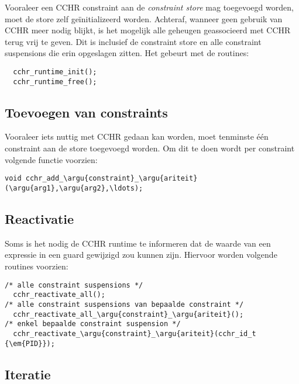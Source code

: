 Vooraleer een CCHR constraint aan de {\em constraint store} mag toegevoegd worden, moet de store zelf ge\"initializeerd worden. Achteraf, wanneer geen gebruik van CCHR meer nodig blijkt, is het mogelijk alle geheugen geassocieerd met CCHR terug vrij te geven. Dit is inclusief de constraint store en alle constraint suspensions die erin opgeslagen zitten. Het gebeurt met de routines:
\begin{Verbatim}
  cchr_runtime_init();
  cchr_runtime_free();
\end{Verbatim}

\subsection{Toevoegen van constraints}

Vooraleer iets nuttig met CCHR gedaan kan worden, moet tenminste \'e\'en constraint aan de store toegevoegd worden. Om dit te doen wordt per constraint volgende functie voorzien: \begin{Verbatim}[commandchars=\\\{\}]
  void cchr_add_\argu{constraint}_\argu{ariteit}(\argu{arg1},\argu{arg2},\ldots);
\end{Verbatim}

\subsection{Reactivatie} \label{sec:crout-reactiv}

Soms is het nodig de CCHR runtime te informeren dat de waarde van een expressie in een guard gewijzigd zou kunnen zijn. Hiervoor worden volgende routines voorzien: \begin{Verbatim}[commandchars=\\\{\}]
/* alle constraint suspensions */
  cchr_reactivate_all(); 
/* alle constraint suspensions van bepaalde constraint */
  cchr_reactivate_all_\argu{constraint}_\argu{ariteit}();
/* enkel bepaalde constraint suspension */
  cchr_reactivate_\argu{constraint}_\argu{ariteit}(cchr_id_t {\em{PID}});
\end{Verbatim}

\subsection{Iteratie}

